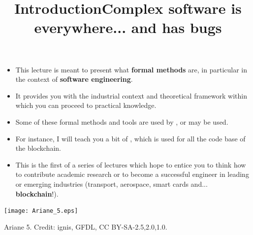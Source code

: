 \documentclass[wide]{slides}
\begin{document}
\begin{slide}
  \title{Introduction}

  \begin{itemize}

    \item This lecture is meant to present what \textbf{formal
      methods} are, in particular in the context of \textbf{software
      engineering}.

    \item It provides you with the industrial context and theoretical
      framework within which you can proceed to practical knowledge.

    \item Some of these formal methods and tools are used by \Tezos,
      or may be used.

    \item For instance, I will teach you a bit of \OCaml, which is
      used for all the code base of the \Tezos blockchain.

    \item This is the first of a series of lectures which hope to
      entice you to think how to contribute academic research or to
      become a successful engineer in leading or emerging industries
      (transport, aerospace, smart cards and... \textbf{blockchain}!).

  \end{itemize}
\end{slide}

\begin{slide}
  \title{Complex software is everywhere... and has bugs}

  \begin{center}
    \texttt{[image: Ariane\_5.eps]}
  \end{center}

  \centerline{Ariane 5. Credit: ignis, GFDL, CC BY-SA-2.5,2.0,1.0.}

\end{slide}
\end{document}
